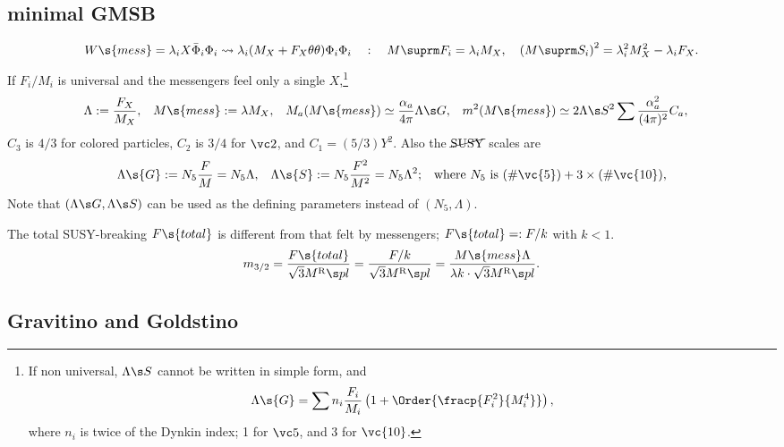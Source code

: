 \newpage
\subsection{minimal GMSB}
$$W\s{mess}=\lambda_i X\bar\Phi_i\Phi_i \leadsto \lambda_i(M_X+F_X\thth)\Phi_i\Phi_i\quad:\quad M\suprm F_i=\lambda_i M_X,\quad \left(M\suprm S_i\right)^2=\lambda_i^2M_X^2-\lambda_iF_X.$$
If $F_i/M_i$ is universal and the messengers feel only a single $X$,\footnote{%
If non universal, $\Lambda\s S$ cannot be written in simple form, and
\begin{equation}
\Lambda\s{G}=\sum n_i\frac{F_i}{M_i}\left(1+\Order{\fracp{F_i^2}{M_i^4}}\right),
\end{equation}
where $n_i$ is twice of the Dynkin index; 1 for $\vc 5$, and 3 for $\vc{10}$.
}
\begin{align}
\Lambda:=\frac{F_X}{M_X},& \quad M\s{mess}:=\lambda M_X,&
 M_a(M\s{mess})&\simeq\frac{\alpha_a}{4\pi}\Lambda\s G,
&m^2(M\s{mess})&\simeq2\Lambda\s S^2\sum\frac{\alpha_a^2}{(4\pi)^2}C_a,
\end{align}
$C_3$ is $4/3$ for colored particles, $C_2$ is $3/4$ for $\vc 2$, and $C_1=(5/3)Y^2$. Also the $\cancel{\rm SUSY}$ scales are
\begin{align}
 \Lambda\s{G}&:=N_5\frac{F}{M}=N_5\Lambda,
&
 \Lambda\s{S}&:=N_5\frac{F^2}{M^2}=N_5\Lambda^2;
 &
 \text{where $N_5$ is $(\#\vc{5})+3\times(\#\vc{10})$,}
\end{align}
Note that $(\Lambda\s G,\Lambda\s S)$ can be used as the defining parameters instead of $(N_5,\Lambda)$.

The total SUSY-breaking $F\s{total}$ is different from that felt by messengers; $F\s{total}=:F/k$ with $k<1$.
\begin{equation}
 m_{3/2}
= \frac{F\s{total}}{\sqrt3\rMPL}
= \frac{F/k}{\sqrt3\rMPL}
= \frac{M\s{mess}\Lambda}{\lambda k\cdot\sqrt3\rMPL}.
\end{equation}

\newpage

\subsection{Gravitino and Goldstino}
\def\goldi{\tilde{\cal G}}
